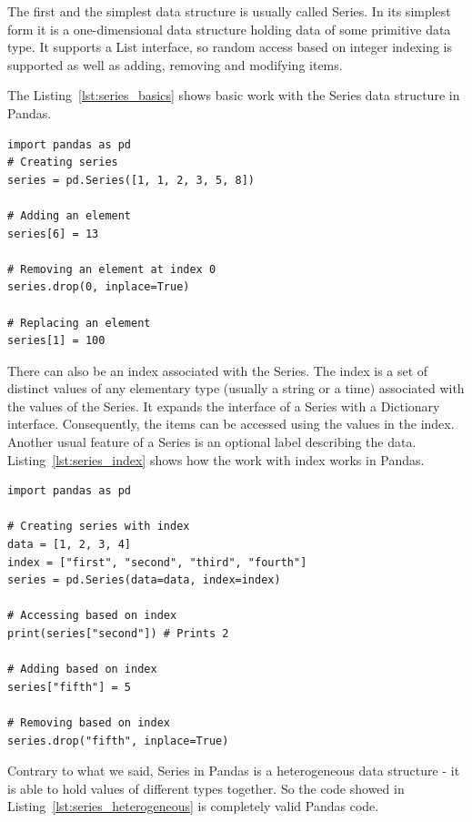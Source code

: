 The first and the simplest data structure is usually called Series.
In its simplest form it is a one-dimensional data structure holding data of some primitive data type.
It supports a List interface, so random access based on integer indexing is supported as well as adding, removing and
modifying items.

The Listing~\ref{lst:series_basics} shows basic work with the Series data structure in Pandas.

\begin{lstlisting}[caption=Working with Series in Pandas, label={lst:series_basics}, captionpos=b]
import pandas as pd
# Creating series
series = pd.Series([1, 1, 2, 3, 5, 8])

# Adding an element
series[6] = 13

# Removing an element at index 0
series.drop(0, inplace=True)

# Replacing an element
series[1] = 100
\end{lstlisting}

There can also be an index associated with the Series.
The index is a set of distinct values of any elementary type (usually a string or a time) associated with the values of
the Series.
It expands the interface of a Series with a Dictionary interface.
Consequently, the items can be accessed using the values in the index. 
Another usual feature of a Series is an optional label describing the data. 
Listing~\ref{lst:series_index} shows how the work with index works in Pandas.

\begin{lstlisting}[caption=Index on a Series, label={lst:series_index}, captionpos=b]
import pandas as pd

# Creating series with index
data = [1, 2, 3, 4]
index = ["first", "second", "third", "fourth"]
series = pd.Series(data=data, index=index)

# Accessing based on index
print(series["second"]) # Prints 2

# Adding based on index
series["fifth"] = 5

# Removing based on index
series.drop("fifth", inplace=True)

\end{lstlisting}

Contrary to what we said, Series in Pandas is a heterogeneous data structure - it is able to hold values of different
types together.
So the code showed in Listing~\ref{lst:series_heterogeneous} is completely valid Pandas code.

